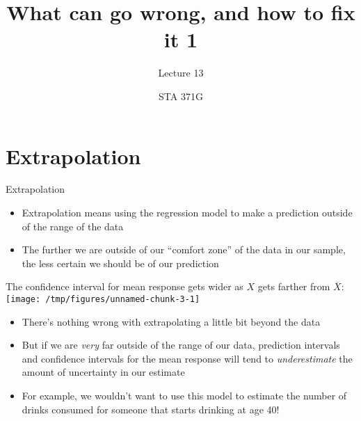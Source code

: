 \documentclass{beamer}\usepackage[]{graphicx}\usepackage[]{color}
\title{What can go wrong, and how to fix it 1}
\subtitle{Lecture 13}
\author{STA 371G}
\makeatletter
\def\maxwidth{ %
  \ifdim\Gin@nat@width>\linewidth
    \linewidth
  \else
    \Gin@nat@width
  \fi
}
\newenvironment{knitrout}{}{} %
\makeatother
\begin{document}
  
  
  

  \frame{\maketitle}



  \begin{darkframes}
    \begin{frame}
    \end{frame}

    \section{Extrapolation}

    \begin{frame}{Extrapolation}
      \begin{itemize}
        \item \alert{Extrapolation} means using the regression model to make a prediction outside of the range of the data
        \item The further we are outside of our ``comfort zone'' of the data in our sample, the less certain we should be of our prediction
      \end{itemize}
    \end{frame}

    \begin{frame}[fragile]
      The confidence interval for mean response gets wider as $X$ gets farther from $\overline X$:
\begin{knitrout}
\color{fgcolor}
\texttt{[image: /tmp/figures/unnamed-chunk-3-1]} 

\end{knitrout}
    \end{frame}

    \begin{frame}
      \begin{itemize}[<+->]
        \item There's nothing wrong with extrapolating a little bit beyond the data
        \item But if we are \emph{very} far outside of the range of our data, prediction intervals and confidence intervals for the mean response will tend to \emph{underestimate} the amount of uncertainty in our estimate
        \item For example, we wouldn't want to use this model to estimate the number of drinks consumed for someone that starts drinking at age 40!
      \end{itemize}
    \end{frame}


\end{darkframes}
\end{document}
